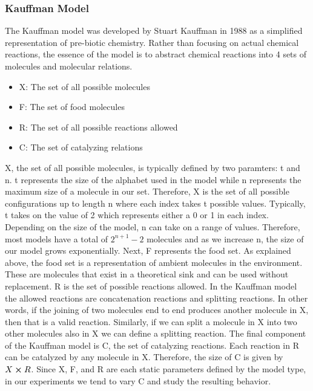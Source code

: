 \documentclass[11pt]{article}
\begin{document}
\subsubsection*{Kauffman Model}

The Kauffman model was developed by Stuart Kauffman in 1988 as a simplified representation of pre-biotic chemistry. 
Rather than focusing on actual chemical reactions, the essence of the model is to abstract chemical reactions into 4 sets of molecules and molecular relations.

\begin{itemize}
    \item X: The set of all possible molecules
    \item F: The set of food molecules
    \item R: The set of all possible reactions allowed
    \item C: The set of catalyzing relations
\end{itemize}

X, the set of all possible molecules, is typically defined by two paramters: t and n. t represents the size of the alphabet used in the model while n represents the maximum size of a molecule in our set. 
Therefore, X is the set of all possible configurations up to length n where each index takes t possible values.
Typically, t takes on the value of 2 which represents either a 0 or 1 in each index. Depending on the size of the model, n can take on a range of values. Therefore, most models have a total of $2^{n +1} -2$ molecules and as we increase n, the size of our model grows exponentially.
Next, F represents the food set. As explained above, the food set is a representation of ambient molecules in the environment. These are molecules that exist in a theoretical sink and can be used without replacement.
R is the set of possible reactions allowed. In the Kauffman model the allowed reactions are concatenation reactions and splitting reactions. In other words, if the joining of two molecules end to end produces another molecule in X, then that is a valid reaction.
Similarly, if we can split a molecule in X into two other molecules also in X we can define a splitting reaction.
The final component of the Kauffman model is C, the set of catalyzing reactions. Each reaction in R can be catalyzed by any molecule in X. Therefore, the size of C is given by $X \cross R$. 
Since X, F, and R are each static parameters defined by the model type, in our experiments we tend to vary C and study the resulting behavior.
\end{document}
